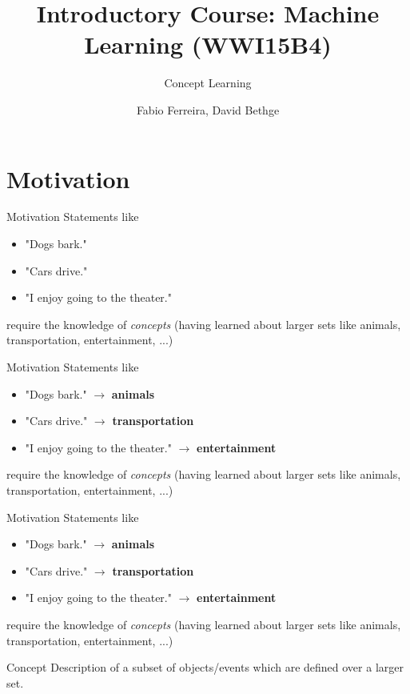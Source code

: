 \documentclass{beamer}
\title[]{Introductory Course: Machine Learning (WWI15B4)}
\subtitle{Concept Learning}
\author{Fabio Ferreira, David Bethge}
\institute{Karlsruhe Institute of Technology}
\date{}
\begin{document}
%
%

\begin{frame}
  \titlepage
\end{frame}

\section{Motivation}

\begin{frame}{Motivation}
Statements like 
\begin{itemize}
  \item "Dogs bark."
  \item "Cars drive."
  \item "I enjoy going to the theater."
\end{itemize}
require the knowledge of \emph{concepts} (having learned about larger sets like animals, transportation, entertainment, ...)
\end{frame}

\begin{frame}{Motivation}
Statements like 
\begin{itemize}
  \item "Dogs bark." $\rightarrow$ \textbf{animals}
  \item "Cars drive." $\rightarrow$ \textbf{transportation}
  \item "I enjoy going to the theater." $\rightarrow$ \textbf{entertainment}
\end{itemize}
require the knowledge of \emph{concepts} (having learned about larger sets like animals, transportation, entertainment, ...)
\end{frame}

\begin{frame}{Motivation}
Statements like 
\begin{itemize}
  \item "Dogs bark." $\rightarrow$ \textbf{animals}
  \item "Cars drive." $\rightarrow$ \textbf{transportation}
  \item "I enjoy going to the theater." $\rightarrow$ \textbf{entertainment}
\end{itemize}
require the knowledge of \emph{concepts} (having learned about larger sets like animals, transportation, entertainment, ...)


\begin{block}{Concept}
Description of a subset of objects/events which are defined over a larger set.
\end{block}


\end{frame}
\end{document}
